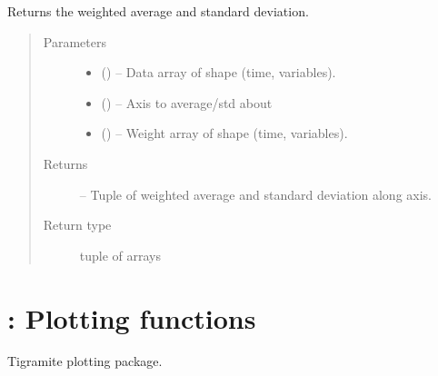 \documentclass[letterpaper,10pt,english]{sphinxmanual}
\begin{document}

\begin{fulllineitems}
\label{\detokenize{index:tigramite.data_processing.weighted_avg_and_std}}
Returns the weighted average and standard deviation.
\begin{quote}\begin{description}
\item[{Parameters}] \leavevmode\begin{itemize}
\item {} 
 () -- Data array of shape (time, variables).

\item {} 
 () -- Axis to average/std about

\item {} 
 () -- Weight array of shape (time, variables).

\end{itemize}

\item[{Returns}] \leavevmode
{} -- Tuple of weighted average and standard deviation along axis.

\item[{Return type}] \leavevmode
tuple of arrays

\end{description}\end{quote}

\end{fulllineitems}



\chapter{: Plotting functions}
\label{\detokenize{index:tigramite-plotting-plotting-functions}}\label{\detokenize{index:module-tigramite.plotting}}
Tigramite plotting package.
\end{document}
